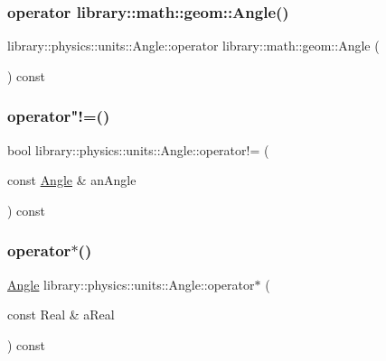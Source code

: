 \subsubsection{\texorpdfstring{operator library\+::math\+::geom\+::\+Angle()}{operator library::math::geom::Angle()}}
{\footnotesize\ttfamily library\+::physics\+::units\+::\+Angle\+::operator library\+::math\+::geom\+::\+Angle (\begin{DoxyParamCaption}{ }\end{DoxyParamCaption}) const}

\mbox{\label{classlibrary_1_1physics_1_1units_1_1_angle_ad25b468efa92e37f8d45d624a9ed6497}} 
\subsubsection{\texorpdfstring{operator"!=()}{operator!=()}}
{\footnotesize\ttfamily bool library\+::physics\+::units\+::\+Angle\+::operator!= (\begin{DoxyParamCaption}\item[{const \hyperlink{classlibrary_1_1physics_1_1units_1_1_angle}{Angle} \&}]{an\+Angle }\end{DoxyParamCaption}) const}

\mbox{\label{classlibrary_1_1physics_1_1units_1_1_angle_a958b708b331ded088189882187a4de89}} 
\subsubsection{\texorpdfstring{operator$\ast$()}{operator*()}}
{\footnotesize\ttfamily \hyperlink{classlibrary_1_1physics_1_1units_1_1_angle}{Angle} library\+::physics\+::units\+::\+Angle\+::operator$\ast$ (\begin{DoxyParamCaption}\item[{const Real \&}]{a\+Real }\end{DoxyParamCaption}) const}

